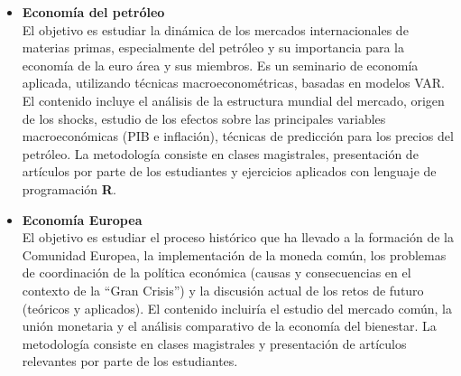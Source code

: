 \documentclass{article}\usepackage[]{graphicx}\usepackage[]{color}
\begin{document}
\begin{itemize}
  \item \textbf{Economía del petróleo}\\
El objetivo es estudiar la dinámica de los mercados internacionales de materias primas, especialmente del petróleo y su importancia para la economía de la euro área y sus miembros. Es un seminario de economía aplicada, utilizando técnicas macroeconométricas, basadas en modelos VAR. El contenido incluye el análisis de la estructura mundial del mercado, origen de los shocks, estudio de los efectos sobre las principales variables macroeconómicas (PIB e inflación), técnicas de predicción para los precios del petróleo. La metodología consiste en clases magistrales, presentación de artículos por parte de los estudiantes y ejercicios aplicados con lenguaje de programación \textbf{\textsf{R}}.

  \item \textbf{Economía Europea}\\
El objetivo es estudiar el proceso histórico que ha llevado a la formación de la Comunidad Europea, la implementación de la moneda común, los problemas de coordinación de la política económica (causas y consecuencias en el contexto de la ``Gran Crisis'') y la discusión actual de los retos de futuro (teóricos y aplicados). El contenido incluiría el estudio del mercado común, la unión monetaria y el análisis comparativo de la economía del bienestar. La metodología consiste en clases magistrales y presentación de artículos relevantes por parte de los estudiantes.
\end{itemize}
\end{document}
